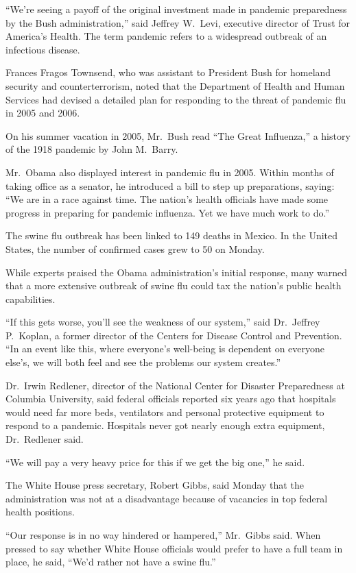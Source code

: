 \documentclass[12pt,a4paper,onecolumn]{article}
\begin{document}
``We're seeing a payoff of the original investment made in pandemic preparedness by the Bush
administration,'' said Jeffrey W.~Levi, executive director of Trust for America's Health. The term
pandemic refers to a widespread outbreak of an infectious disease.

Frances Fragos Townsend, who was assistant to President Bush for homeland security and
counterterrorism, noted that the Department of Health and Human Services had devised a detailed plan
for responding to the threat of pandemic flu in 2005 and 2006.

On his summer vacation in 2005, Mr.~Bush read ``The Great Influenza,'' a history of the 1918
pandemic by John M.~Barry.

Mr.~Obama also displayed interest in pandemic flu in 2005. Within months of taking office as a
senator, he introduced a bill to step up preparations, saying: ``We are in a race against time. The
nation's health officials have made some progress in preparing for pandemic influenza. Yet we have
much work to do.''

The swine flu outbreak has been linked to 149 deaths in Mexico. In the United States, the number of
confirmed cases grew to 50 on Monday.

While experts praised the Obama administration's initial response, many warned that a more extensive
outbreak of swine flu could tax the nation's public health capabilities.

``If this gets worse, you'll see the weakness of our system,'' said Dr.~Jeffrey P.~Koplan, a former
director of the Centers for Disease Control and Prevention. ``In an event like this, where
everyone's well-being is dependent on everyone else's, we will both feel and see the problems our
system creates.''

Dr.~Irwin Redlener, director of the National Center for Disaster Preparedness at Columbia
University, said federal officials reported six years ago that hospitals would need far more beds,
ventilators and personal protective equipment to respond to a pandemic. Hospitals never got nearly
enough extra equipment, Dr.~Redlener said.

``We will pay a very heavy price for this if we get the big one,'' he said.

The White House press secretary, Robert Gibbs, said Monday that the administration was not at a
disadvantage because of vacancies in top federal health positions.

``Our response is in no way hindered or hampered,'' Mr.~Gibbs said. When pressed to say whether
White House officials would prefer to have a full team in place, he said, ``We'd rather not have a
swine flu.''
\end{document}
